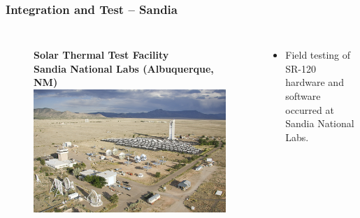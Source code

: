 \documentclass[aspectratio=169]{beamer}
\begin{document}
\begin{frame}
  \frametitle{Integration and Test -- Sandia}
  \begin{columns}[c]
    \begin{figure}
      \textbf{Solar Thermal Test Facility\\Sandia National Labs
        (Albuquerque, NM)}
      \includegraphics[width=\linewidth]{Sandia.png}
    \end{figure}

    \begin{itemize}
    \item Field testing of SR-120 hardware and software occurred at
      Sandia National Labs.
    \end{itemize}
  \end{columns}
\end{frame}
\end{document}
